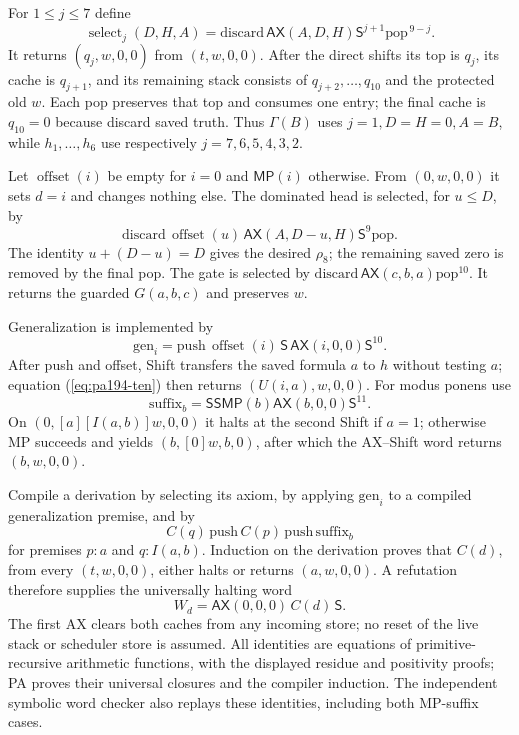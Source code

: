 For $1\le j\le7$ define
\[
 \operatorname{select}_j(D,H,A)=
 \mathrm{discard}\,\mathsf{AX}(A,D,H)
                    \mathsf S^{j+1}\mathrm{pop}^{\,9-j}.
\]
It returns $(q_j,w,0,0)$ from $(t,w,0,0)$.
After the direct shifts its top is $q_j$, its cache is $q_{j+1}$,
and its remaining stack consists of $q_{j+2},\ldots,q_{10}$ and
the protected old $w$. Each pop preserves that top and consumes one
entry; the final cache is $q_{10}=0$ because discard saved truth.
Thus $\Gamma(B)$ uses $j=1,D=H=0,A=B$, while $h_1,\ldots,h_6$
use respectively $j=7,6,5,4,3,2$.

Let $\operatorname{offset}(i)$ be empty for $i=0$ and
$\mathsf{MP}(i)$ otherwise. From $(0,w,0,0)$ it sets $d=i$ and
changes nothing else. The dominated head is selected, for $u\le D$,
by
\[
 \mathrm{discard}\,\operatorname{offset}(u)\,
 \mathsf{AX}(A,D-u,H)\mathsf S^9\mathrm{pop}.
\]
The identity $u+(D-u)=D$ gives the desired $\rho_8$; the remaining
saved zero is removed by the final pop. The gate is selected by
$\mathrm{discard}\,\mathsf{AX}(c,b,a)\mathrm{pop}^{10}$.
It returns the guarded $G(a,b,c)$ and preserves $w$.

Generalization is implemented by
\[
 \mathrm{gen}_i=\mathrm{push}\,\operatorname{offset}(i)\,
                  \mathsf S\,\mathsf{AX}(i,0,0)\mathsf S^{10}.
\]
After push and offset, Shift transfers the saved formula $a$ to
$h$ without testing $a$; equation (\ref{eq:pa194-ten}) then returns
$(U(i,a),w,0,0)$. For modus ponens use
\[
 \mathrm{suffix}_b=
   \mathsf S\mathsf S\mathsf{MP}(b)\mathsf{AX}(b,0,0)\mathsf S^{11}.
\]
On $(0,[a][I(a,b)]w,0,0)$ it halts at the second Shift if $a=1$;
otherwise MP succeeds and yields $(b,[0]w,b,0)$, after which the
AX--Shift word returns $(b,w,0,0)$.

Compile a derivation by selecting its axiom, by applying
$\mathrm{gen}_i$ to a compiled generalization premise, and by
\[
 C(q)\,\mathrm{push}\,C(p)\,\mathrm{push}\,\mathrm{suffix}_b
\]
for premises $p:a$ and $q:I(a,b)$. Induction on the derivation
proves that $C(d)$, from every $(t,w,0,0)$, either halts or returns
$(a,w,0,0)$. A refutation therefore supplies the universally halting
word
\[
 W_d=\mathsf{AX}(0,0,0)\,C(d)\,\mathsf S.
\]
The first AX clears both caches from any incoming store; no reset
of the live stack or scheduler store is assumed. All identities are
equations of primitive-recursive arithmetic functions, with the
displayed residue and positivity proofs; PA proves their universal
closures and the compiler induction. The independent symbolic word
checker also replays these identities, including both MP-suffix cases.

